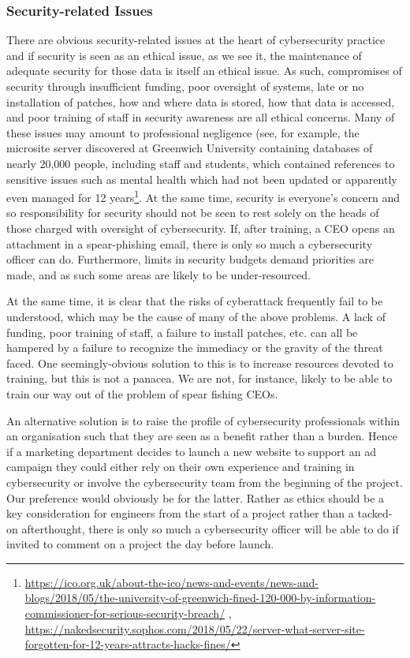 \documentclass{svjour3}                     %
\begin{document}
\subsubsection{Security-related Issues}
There are obvious security-related issues at the heart of cybersecurity practice and if security is seen as an ethical issue, as we see it, the maintenance of adequate security for those data is itself an ethical issue. As such, compromises of security through insufficient funding, poor oversight of systems, late or no installation of patches, how and where data is stored, how that data is accessed, and poor training of staff in security awareness are all ethical concerns. Many of these issues may amount to professional negligence (see, for example, the microsite server discovered at Greenwich University containing databases of nearly 20,000 people, including staff and students, which contained references to sensitive issues such as mental health which had not been updated or apparently even managed for 12 years\footnote{\url{https://ico.org.uk/about-the-ico/news-and-events/news-and-blogs/2018/05/the-university-of-greenwich-fined-120-000-by-information-commissioner-for-serious-security-breach/} , \url{https://nakedsecurity.sophos.com/2018/05/22/server-what-server-site-forgotten-for-12-years-attracts-hacks-fines/}}. At the same time, security is everyone’s concern and so responsibility for security should not be seen to rest solely on the heads of those charged with oversight of cybersecurity. If, after training, a CEO opens an attachment in a spear-phishing email, there is only so much a cybersecurity officer can do. Furthermore, limits in security budgets demand priorities are made, and as such some areas are likely to be under-resourced.

At the same time, it is clear that the risks of cyberattack frequently fail to be understood, which may be the cause of many of the above problems. A lack of funding, poor training of staff, a failure to install patches, etc. can all be hampered by a failure to recognize the immediacy or the gravity of the threat faced. One seemingly-obvious solution to this is to increase resources devoted to training, but this is not a panacea. We are not, for instance, likely to be able to train our way out of the problem of spear fishing CEOs.

An alternative solution is to raise the profile of cybersecurity professionals within an organisation such that they are seen as a benefit rather than a burden. Hence if a marketing department decides to launch a new website to support an ad campaign they could either rely on their own experience and training in cybersecurity or involve the cybersecurity team from the beginning of the project. Our preference would obviously be for the latter. Rather as ethics should be a key consideration for engineers from the start of a project rather than a tacked-on afterthought, there is only so much a cybersecurity officer will be able to do if invited to comment on a project the day before launch.
\end{document}
